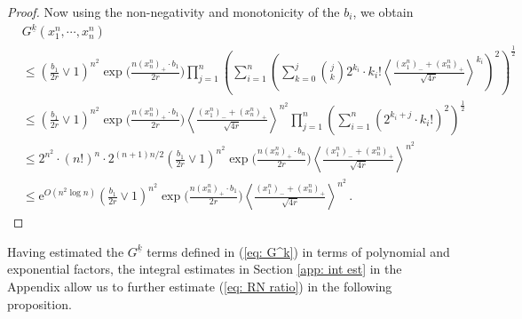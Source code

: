 \documentclass[11pt, reqno]{amsart}
\numberwithin{equation}{section}
\begin{document}
\begin{proof}
     Now using the non-negativity and monotonicity of the $b_i$, we obtain
     \begin{equation*}
    \begin{array}{cc}
        &G^{\underline{k}}(x^n_1,\cdots, x^n_n)\\
        &\le  \left(\frac{b_1}{2r}\lor 1\right)^{n^2}\exp\big(\frac{n(x^n_n)_+ \cdot b_1}{2r}\big)\displaystyle\prod_{j=1}^n \left(\displaystyle\sum_{i=1}^n \left(\displaystyle\sum_{k=0}^j {\binom{j}{k}}2^{k_i} \cdot k_i!\left\langle \frac{(x^n_1)_- + (x^n_n)_+}{\sqrt{4r}}\right\rangle^{k_i} \right)^2\right)^{\frac{1}{2}}\\
        & \le \left(\frac{b_1}{2r}\lor 1\right)^{n^2}\exp\big(\frac{n(x^n_n)_+ \cdot b_1}{2r}\big)\left\langle \frac{(x^n_1)_- + (x^n_n)_+}{\sqrt{4r}}\right\rangle^{n^2}\displaystyle\prod_{j=1}^n \left(\displaystyle\sum_{i=1}^n \left(\displaystyle 2^{k_i+j} \cdot k_i!\right)^2\right)^{\frac{1}{2}}\\
        & \le 2^{n^2} \cdot (n!)^n\cdot 2^{(n+1)n/2}\left(\frac{b_1}{2r}\lor 1\right)^{n^2}\exp\big(\frac{n(x^n_n)_+ \cdot b_n}{2r}\big)\left\langle \frac{(x^n_1)_- + (x^n_n)_+}{\sqrt{4r}}\right\rangle^{n^2} \\
        &\le \mathrm{e}^{O(n^2\log n)}\left(\frac{b_1}{2r}\lor 1\right)^{n^2}\exp\big(\frac{n(x^n_n)_+ \cdot b_1}{2r}\big)\left\langle \frac{(x^n_1)_- + (x^n_n)_+}{\sqrt{4r}}\right\rangle^{n^2}\,.
    \end{array}
\end{equation*}
\end{proof}

Having estimated the $G^{\underline{k}}$ terms defined in (\ref{eq: G^k}) in terms of polynomial and exponential factors, the integral estimates in Section \ref{app: int est} in the Appendix allow us to further estimate (\ref{eq: RN ratio}) in the following proposition.  
\end{document}
